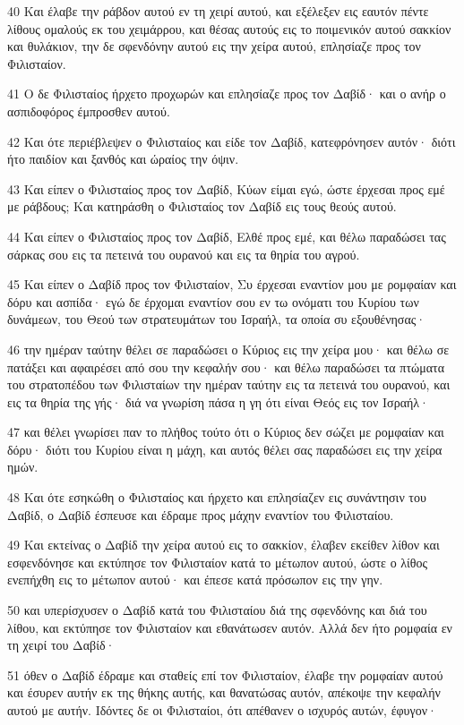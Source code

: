 \par 40 Και έλαβε την ράβδον αυτού εν τη χειρί αυτού, και εξέλεξεν εις εαυτόν πέντε λίθους ομαλούς εκ του χειμάρρου, και θέσας αυτούς εις το ποιμενικόν αυτού σακκίον και θυλάκιον, την δε σφενδόνην αυτού εις την χείρα αυτού, επλησίαζε προς τον Φιλισταίον.
\par 41 Ο δε Φιλισταίος ήρχετο προχωρών και επλησίαζε προς τον Δαβίδ· και ο ανήρ ο ασπιδοφόρος έμπροσθεν αυτού.
\par 42 Και ότε περιέβλεψεν ο Φιλισταίος και είδε τον Δαβίδ, κατεφρόνησεν αυτόν· διότι ήτο παιδίον και ξανθός και ώραίος την όψιν.
\par 43 Και είπεν ο Φιλισταίος προς τον Δαβίδ, Κύων είμαι εγώ, ώστε έρχεσαι προς εμέ με ράβδους; Και κατηράσθη ο Φιλισταίος τον Δαβίδ εις τους θεούς αυτού.
\par 44 Και είπεν ο Φιλισταίος προς τον Δαβίδ, Ελθέ προς εμέ, και θέλω παραδώσει τας σάρκας σου εις τα πετεινά του ουρανού και εις τα θηρία του αγρού.
\par 45 Και είπεν ο Δαβίδ προς τον Φιλισταίον, Συ έρχεσαι εναντίον μου με ρομφαίαν και δόρυ και ασπίδα· εγώ δε έρχομαι εναντίον σου εν τω ονόματι του Κυρίου των δυνάμεων, του Θεού των στρατευμάτων του Ισραήλ, τα οποία συ εξουθένησας·
\par 46 την ημέραν ταύτην θέλει σε παραδώσει ο Κύριος εις την χείρα μου· και θέλω σε πατάξει και αφαιρέσει από σου την κεφαλήν σου· και θέλω παραδώσει τα πτώματα του στρατοπέδου των Φιλισταίων την ημέραν ταύτην εις τα πετεινά του ουρανού, και εις τα θηρία της γής· διά να γνωρίση πάσα η γη ότι είναι Θεός εις τον Ισραήλ·
\par 47 και θέλει γνωρίσει παν το πλήθος τούτο ότι ο Κύριος δεν σώζει με ρομφαίαν και δόρυ· διότι του Κυρίου είναι η μάχη, και αυτός θέλει σας παραδώσει εις την χείρα ημών.
\par 48 Και ότε εσηκώθη ο Φιλισταίος και ήρχετο και επλησίαζεν εις συνάντησιν του Δαβίδ, ο Δαβίδ έσπευσε και έδραμε προς μάχην εναντίον του Φιλισταίου.
\par 49 Και εκτείνας ο Δαβίδ την χείρα αυτού εις το σακκίον, έλαβεν εκείθεν λίθον και εσφενδόνησε και εκτύπησε τον Φιλισταίον κατά το μέτωπον αυτού, ώστε ο λίθος ενεπήχθη εις το μέτωπον αυτού· και έπεσε κατά πρόσωπον εις την γην.
\par 50 και υπερίσχυσεν ο Δαβίδ κατά του Φιλισταίου διά της σφενδόνης και διά του λίθου, και εκτύπησε τον Φιλισταίον και εθανάτωσεν αυτόν. Αλλά δεν ήτο ρομφαία εν τη χειρί του Δαβίδ·
\par 51 όθεν ο Δαβίδ έδραμε και σταθείς επί τον Φιλισταίον, έλαβε την ρομφαίαν αυτού και έσυρεν αυτήν εκ της θήκης αυτής, και θανατώσας αυτόν, απέκοψε την κεφαλήν αυτού με αυτήν. Ιδόντες δε οι Φιλισταίοι, ότι απέθανεν ο ισχυρός αυτών, έφυγον·
